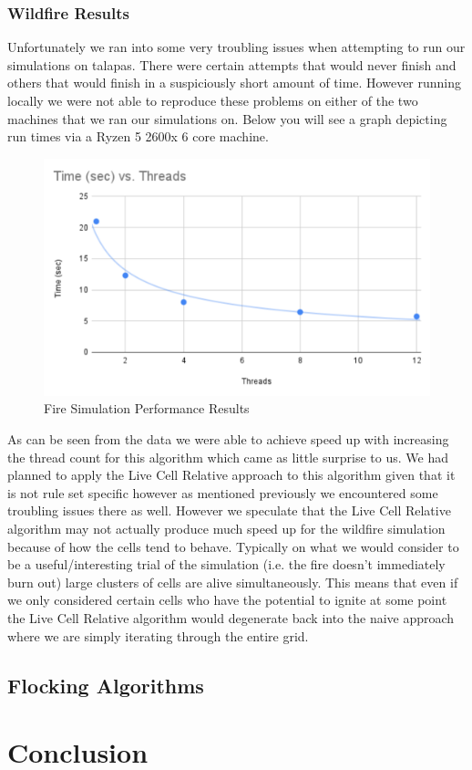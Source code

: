 \documentclass[12pt]{article}
\begin{document}
\subsubsection{Wildfire Results}
Unfortunately we ran into some very troubling issues when attempting to run our simulations on talapas. There were certain attempts that would never finish and others that would finish in a suspiciously short amount of time. However running locally we were not able to reproduce these problems on either of the two machines that we ran our simulations on. Below you will see a graph depicting run times via a Ryzen 5 2600x 6 core machine.
\begin{figure}[!ht]
    \centering
    \includegraphics[width=\linewidth]{FireSimResGraph.PNG}
    \caption{Fire Simulation Performance Results}
    \label{fig:fireR}
\end{figure}
\par
As can be seen from the data we were able to achieve speed up with increasing the thread count for this algorithm which came as little surprise to us. We had planned to apply the Live Cell Relative approach to this algorithm given that it is not rule set specific however as mentioned previously we encountered some troubling issues there as well. However we speculate that the Live Cell Relative algorithm may not actually produce much speed up for the wildfire simulation because of how the cells tend to behave. Typically on what we would consider to be a useful/interesting trial of the simulation (i.e. the fire doesn't immediately burn out) large clusters of cells are alive simultaneously. This means that even if we only considered certain cells who have the potential to ignite at some point the Live Cell Relative algorithm would degenerate back into the naive approach where we are simply iterating through the entire grid.
\\

\subsection{Flocking Algorithms}

\section{Conclusion}



\end{document}
